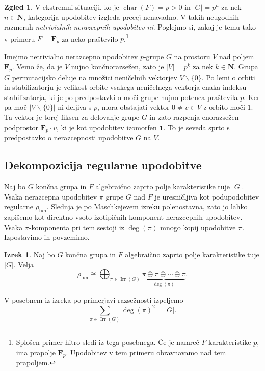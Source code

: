 \documentclass[11pt]{book}
\def\NN{\mathbf{N}}
\def\11{\mathbf{1}}
\def\FF{\mathbf{F}}
\DeclareMathOperator\Irr{Irr}
\DeclareMathOperator\characteristic{char}
\DeclareMathOperator\fun{fun}
\theoremstyle{definition}
\theoremstyle{zgled}
\newtheorem*{zgled}{Zgled}
\theoremstyle{odprtproblem}
\theoremstyle{domacanaloga}
\theoremstyle{izrek}
\newtheorem*{izrek}{Izrek}
\begin{document}
\begin{zgled}
V ekstremni situaciji, ko je $\characteristic(F) = p > 0$ in $|G| = p^n$ za nek $n \in \NN$, kategorija upodobitev izgleda precej nenavadno. V takih neugodnih razmerah \emph{netrivialnih nerazcepnih upodobitev ni}. Poglejmo si, zakaj je temu tako v primeru $F = \FF_p$ za neko praštevilo $p$.\footnote{Splošen primer hitro sledi iz tega posebnega. Če je namreč $F$ karakteristike $p$, ima prapolje $\FF_p$. Upodobitev v tem primeru obravnavamo nad tem prapoljem.}

Imejmo netrivialno nerazcepno upodobitev $p$-grupe $G$ na prostoru $V$ nad poljem $\FF_p$. Vemo že, da je $V$ nujno končnorazsežen, zato je $|V| = p^k$ za nek $k \in \NN$. Grupa $G$ permutacijsko deluje na množici neničelnih vektorjev $V \backslash \{ 0 \}$. Po lemi o orbiti in stabilizatorju je velikost orbite vsakega neničelnega vektorja enaka indeksu stabilizatorja, ki je po predpostavki o moči grupe nujno potenca praštevila $p$. Ker pa moč $|V \backslash \{ 0 \}|$ ni deljiva s $p$, mora obstajati vektor $0 \neq v \in V$ z orbito moči $1$. Ta vektor je torej fiksen za delovanje grupe $G$ in zato razpenja enorazsežen podprostor $\FF_p \cdot v$, ki je kot upodobitev izomorfen $\11$. To je seveda sprto s predpostavko o nerazcepnosti upodobitve $G$ na $V$.
\end{zgled}

\subsection{Dekompozicija regularne upodobitve}

Naj bo $G$ končna grupa in $F$ algebraično zaprto polje karakteristike tuje $|G|$. Vsaka nerazcepna upodobitev $\pi$ grupe $G$ nad $F$ je uresničljiva kot podupodobitev regularne $\rho_{\fun}$. Slednja je po Maschkejevem izreku polenostavna, zato jo lahko zapišemo kot direktno vsoto izotipičnih komponent nerazcepnih upodobitev. Vsaka $\pi$-komponenta pri tem sestoji iz $\deg(\pi)$ mnogo kopij upodobitve $\pi$. Izpostavimo in povzemimo.

\begin{izrek}
Naj bo $G$ končna grupa in $F$ algebraično zaprto polje karakteristike tuje $|G|$. Velja
\[
    \rho_{\fun} \cong \bigoplus_{\pi \in \Irr(G)} \underbrace{\pi \oplus \pi \oplus \cdots \oplus \pi}_{\deg(\pi)}.
\]
\end{izrek}

V posebnem iz izreka po primerjavi razsežnosti izpeljemo
\[
    \sum_{\pi \in \Irr(G)} \deg(\pi)^2 = |G|.
\]
\end{document}
